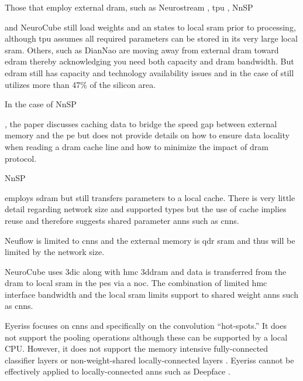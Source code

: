 Those that employ external \ac{dram}, such as Neurostream \cite{azarkhish2017neurostream}, \ac{tpu} \cite{tensorflow2015-whitepaper}, NnSP{\cite{esmaeilzadeh2005nnsp} and NeuroCube\cite{kim2016neurocube} still 
load weights and \ac{an} states to local \ac{sram} prior to processing, although \ac{tpu} assumes all required parameters can be stored in its very large local \ac{sram}.
Others, such as DianNao \cite{chen2016diannao} are moving away from external \ac{dram} toward \ac{edram} thereby acknowledging you need both capacity and \ac{dram} bandwidth. 
But \ac{edram} still has capacity and technology availability issues and in the case of \cite{dadiannao2017} still utilizes more than 47\% of the silicon area.

In the case of NnSP{\cite{esmaeilzadeh2005nnsp}, the paper discusses caching data to bridge the speed gap between external memory and the \ac{pe} 
but does not provide details on how to ensure data locality when reading a \ac{dram} cache line and how to minimize the impact of \ac{dram} protocol.

NnSP {\cite{esmaeilzadeh2005nnsp} employs \ac{sdram} but still transfers parameters to a local cache.
There is very little detail regarding network size and supported types but the use of cache implies reuse and therefore suggests shared parameter \acp{ann} such as \acp{cnn}.

Neuflow\cite{farabet2011neuflow} is limited to \acp{cnn} and the external memory is \ac{qdr} \ac{sram} 
and thus will be limited by the network size.

NeuroCube uses \ac{3dic} along with \ac{hmc} \ac{3ddram} and data is transferred from the \ac{dram} to local \ac{sram} in the \acp{pe} via a \ac{noc}.
The combination of limited \ac{hmc} interface bandwidth and the local \ac{sram} limits support to shared weight \acp{ann} such as \acp{cnn}.

Eyeriss\cite{chen201614} focuses on \acp{cnn} and specifically on the convolution ``hot-spots.''  It does not support the pooling operations although these can
be supported by a local CPU.  However, it does not support the memory intensive fully-connected classifier layers or non-weight-shared locally-connected layers \cite{le2013building}\cite{Taigman_2014_CVPR}.
Eyeriss cannot be effectively applied to locally-connected \acp{ann} such as Deepface \cite{Taigman_2014_CVPR}.

}}}
